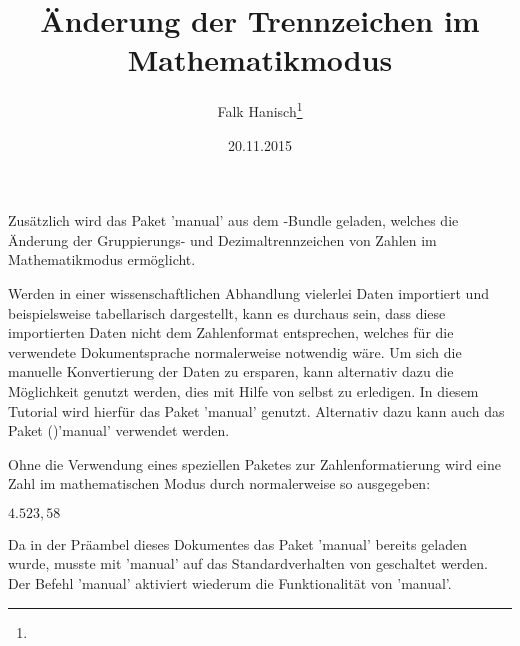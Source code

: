 \documentclass[english,ngerman]{tudscrartcl}
\begin{document}
\begin{Bundle}{}
\date{20.11.2015}
\author{Falk Hanisch\thanks{\noexpand\scriptsize\noexpand\Email{\tudscrmail}}}
\title{Änderung der Trennzeichen im Mathematikmodus}
\makeatletter
\begingroup%
  \def\and{, }%
  \let\thanks\@gobble%
  \let\footnote\@gobble%
\endgroup%
\markright{\@title}
\makeatother
\StartTutorial
%
%
Zusätzlich wird das Paket 'manual' aus dem \TUDScript-Bundle 
geladen, welches die Änderung der Gruppierungs- und Dezimaltrennzeichen von 
Zahlen im Mathematikmodus ermöglicht.
%
\begin{Preamble}
\usepackage{mathswap}
\end{Preamble}
%
Werden in einer wissenschaftlichen Abhandlung vielerlei Daten importiert und 
beispielsweise tabellarisch dargestellt, kann es durchaus sein, dass diese 
importierten Daten nicht dem Zahlenformat entsprechen, welches für die 
verwendete Dokumentsprache normalerweise notwendig wäre. Um sich die manuelle 
Konvertierung der Daten zu ersparen, kann alternativ dazu die Möglichkeit 
genutzt werden, dies mit Hilfe von  selbst zu erledigen. In 
diesem Tutorial wird hierfür das Paket 'manual' genutzt. 
Alternativ dazu kann auch das Paket ()'manual' verwendet 
werden.

Ohne die Verwendung eines speziellen Paketes zur Zahlenformatierung wird eine 
Zahl im mathematischen Modus durch  normalerweise so 
ausgegeben: 
%
\begin{Trunk*}
\mathswapoff
\(4.523,58\)
\mathswapon

\end{Trunk*}
%
Da in der Präambel dieses Dokumentes das Paket 'manual' 
bereits geladen wurde, musste mit 'manual' auf das 
Standardverhalten von  geschaltet werden. Der Befehl 
'manual' aktiviert wiederum die Funktionalität von 
'manual'.


\end{Bundle}
\end{document}
